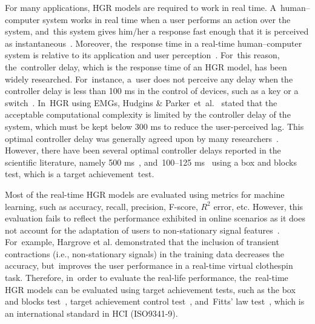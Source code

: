 \documentclass[sensors,review,accept,moreauthors,pdftex]{Definitions/mdpi}
\begin{document}
For many applications, HGR models are required to work in real time. A~human--computer system works in real time when a user performs an action over the system, and~this system gives him/her a response fast enough that it is perceived as instantaneous~\cite{AsghariOskoei2007}. Moreover, the~response time in a real-time human--computer system is relative to its application and user perception~\cite{Miller1968}. For~this reason, the~controller delay, which is the response time of an HGR model, has been widely researched. For~instance, a~user does not perceive any delay when the controller delay is less than 100 ms in the control of devices, such as a key or a switch~\cite{Card1983,Miller1968}. In~HGR using EMGs, Hudgins \& Parker~et~al.~\cite{hudgins1993new} stated that the acceptable computational complexity is limited by the controller delay of the system, which must be kept below 300 ms to reduce the user-perceived lag. This optimal controller delay was generally agreed upon by many researchers~\cite{Englehart2003,Englehart2001}. However, there have been several optimal controller delays reported in the scientific literature, namely 500 ms~\cite{Graupe1983}, and~100--125 ms~\cite{Farrel2007} using a box and blocks test, which is a target achievement~test.


Most of the real-time HGR models are evaluated using metrics for machine learning, such as accuracy, recall, precision, F-score, 
\begin{math}
R^{2}
\end{math} error, etc. However, this evaluation fails to reflect the performance exhibited in online scenarios as it does not account for the adaptation of users to non-stationary signal features~\cite{jiang2013intuitive,ortiz2015offline,vujaklija2017translating,gusman2017evaluation,lock2005real}. For~example, Hargrove {et al}. \cite{hargrove2007real} demonstrated that the inclusion of transient contractions (i.e., non-stationary signals) in the training data decreases the accuracy, but~improves the user performance in a real-time virtual clothespin task. Therefore, in~order to evaluate the real-life performance, the~real-time HGR models can be evaluated using target achievement tests, such as the box and blocks test~\cite{Farrel2007,mathiowetz1985adult}, target achievement control test~\cite{simon2011target}, and~Fitts’ law test~\cite{fitts1954information}, which is an international standard in HCI (ISO9341-9).
 
\end{document}
